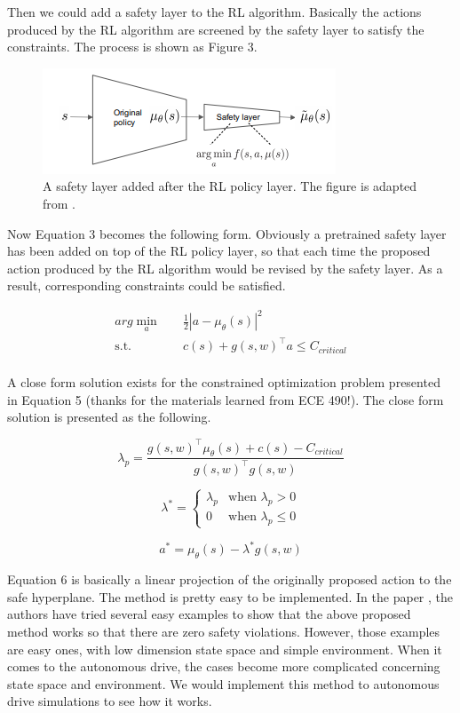 \documentclass{article} %
\begin{document}
Then we could add a safety layer to the RL algorithm. Basically the actions produced by the RL algorithm are screened by the safety layer to satisfy the constraints. The process is shown as Figure 3.

\begin{figure}[!htb]
  \centering
  \includegraphics[width=0.5\linewidth]{fig3_scheme.png}
  \caption{A safety layer added after the RL policy layer. The figure is adapted from \cite{dalal2018safe}.}
\end{figure}

Now Equation 3 becomes the following form. Obviously a pretrained safety layer has been added on top of the RL policy layer, so that each time the proposed action produced by the RL algorithm would be revised by the safety layer. As a result, corresponding constraints could be satisfied.

\begin{equation}
\begin{aligned}
arg \min_{a} \quad & \frac{1}{2} |a - \mu_{\theta}(s)|^2\\
\textrm{s.t.} \quad & c(s) + g(s, w)^\intercal a \leq C_{critical}\\
\end{aligned}
\end{equation}

A close form solution exists for the constrained optimization problem presented in Equation 5 (thanks for the materials learned from ECE 490!). The close form solution is presented as the following.

$$\lambda_p = \frac{g(s, w)^\intercal \mu_{\theta}(s) + c(s) - C_{critical}}{g(s,w)^\intercal g(s,w)}$$

\begin{equation}
\lambda^{*} = \begin{cases}
           \lambda_p & \text{when $\lambda_p > 0 $} \\
           0         & \text{when $\lambda_p \leq 0$}
         \end{cases}
\end{equation}

$$a^* = \mu_{\theta}(s) - \lambda^* g(s, w)$$

Equation 6 is basically a linear projection of the originally proposed action to the safe hyperplane. The method is pretty easy to be implemented. In the paper \cite{dalal2018safe}, the authors have tried several easy examples to show that the above proposed method works so that there are zero safety violations. However, those examples are easy ones, with low dimension state space and simple environment. When it comes to the autonomous drive, the cases become more complicated concerning state space and environment. We would implement this method to autonomous drive simulations to see how it works.
\end{document}
